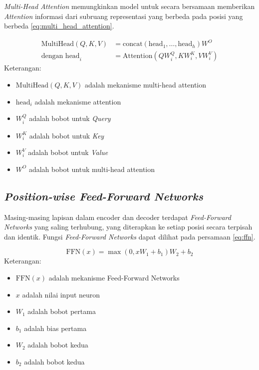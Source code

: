 \textit{Multi-Head Attention} memungkinkan model untuk secara bersamaan memberikan \textit{Attention} informasi dari subruang representasi yang berbeda pada posisi yang berbeda \ref{eq:multi_head_attention}.

\begin{equation}
\begin{aligned}
    \text{MultiHead}(Q, K, V) &= \text{concat}(\text{head}_1, \ldots, \text{head}_h) W^O \\
    \text{dengan head}_i &= \text{Attention}(Q W^Q_i, K W^K_i, V W^V_i)
\end{aligned}
\label{eq:multi_head_attention}
\end{equation}
Keterangan:
\begin{itemize}
    \item $\text{MultiHead}(Q, K, V)$ adalah mekanisme multi-head attention
    \item $\text{head}_i$ adalah mekanisme attention
    \item $W^Q_i$ adalah bobot untuk \textit{Query}
    \item $W^K_i$ adalah bobot untuk \textit{Key}
    \item $W^V_i$ adalah bobot untuk \textit{Value}
    \item $W^O$ adalah bobot untuk multi-head attention
\end{itemize}

\subsection{\textit{Position-wise Feed-Forward Networks}}
Masing-masing lapisan dalam encoder dan decoder terdapat \textit{Feed-Forward Networks} yang saling terhubung, yang diterapkan ke setiap posisi secara terpisah dan identik. Fungsi \textit{Feed-Forward Networks} dapat dilihat pada persamaan \ref{eq:ffn}.

\begin{equation}
   \text{FFN}(x) = \max(0, xW_1 + b_1)W_2 + b_2
   \label{eq:ffn}
\end{equation}
Keterangan:
\begin{itemize}
    \item $\text{FFN}(x)$ adalah mekanisme Feed-Forward Networks
    \item $x$ adalah nilai input neuron
    \item $W_1$ adalah bobot pertama
    \item $b_1$ adalah bias pertama
    \item $W_2$ adalah bobot kedua
    \item $b_2$ adalah bobot kedua
\end{itemize}

